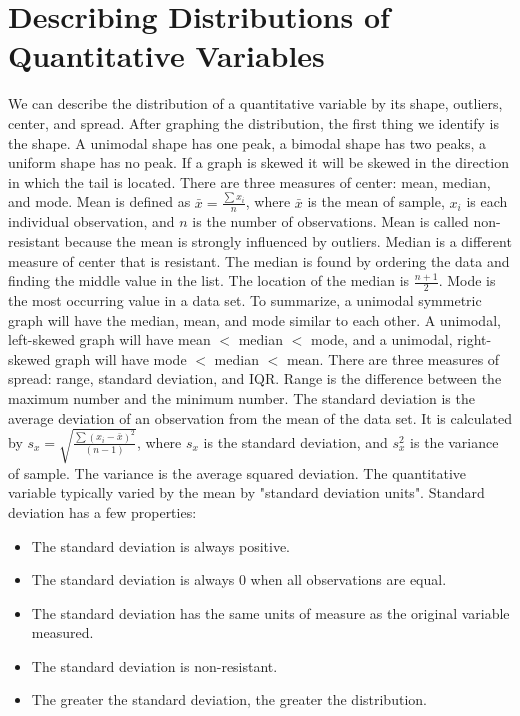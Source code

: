 \documentclass[../stats.tex]{subfiles}
\begin{document}
\section{Describing Distributions of Quantitative Variables}
We can describe the distribution of a quantitative variable by its shape, outliers, center, and spread.
\smallbreak
After graphing the distribution, the first thing we identify is the shape. A unimodal shape has one peak, a bimodal shape has two peaks, a uniform shape has no peak. If a graph is skewed it will be skewed in the direction in which the tail is located.
\smallbreak
There are three measures of center: mean, median, and mode. Mean is defined as $\bar{x}=\frac{\sum{x_i}}{n}$, where $\bar{x}$ is the mean of sample, $x_i$ is each individual observation, and $n$ is the number of observations. Mean is called non-resistant because the mean is strongly influenced by outliers.
\smallbreak
Median is a different measure of center that is resistant. The median is found by ordering the data and finding the middle value in the list. The location of the median is $\frac{n+1}{2}$.
\smallbreak
Mode is the most occurring value in a data set.
\smallbreak
To summarize, a unimodal symmetric graph will have the median, mean, and mode similar to each other. A unimodal, left-skewed graph will have mean $<$ median $<$ mode, and a unimodal, right-skewed graph will have mode $<$ median $<$ mean.
\smallbreak
There are three measures of spread: range, standard deviation, and IQR.
\smallbreak
Range is the difference between the maximum number and the minimum number.
\smallbreak
The standard deviation is the average deviation of an observation from the mean of the data set. It is calculated by $s_x=\sqrt{\frac{\sum{(x_i-\bar{x})^2}}{(n-1)}}$, where $s_x$ is the standard deviation, and $s_x^2$ is the variance of sample.
\smallbreak
The variance is the average squared deviation. The quantitative variable typically varied by the mean by "standard deviation units".
\smallbreak
Standard deviation has a few properties:
\begin{itemize}
    \item The standard deviation is always positive.
    \item The standard deviation is always 0 when all observations are equal.
    \item The standard deviation has the same units of measure as the original variable measured.
    \item The standard deviation is non-resistant.
    \item The greater the standard deviation, the greater the distribution.
\end{itemize}
\end{document}

